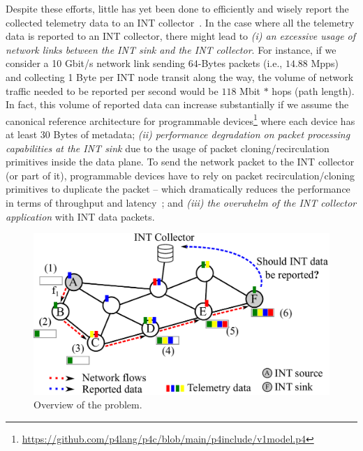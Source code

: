 Despite these efforts, little has yet been done to efficiently and wisely report the collected telemetry data to an INT collector~\cite{9525085}. In the case where all the telemetry data is reported to an INT collector, there might lead to \textit{(i) an excessive usage of network links between the INT sink and the INT collector}. For instance, if we consider a 10 Gbit/s network link sending $64$-Bytes packets (i.e.,  $14.88$ Mpps) and collecting 1 Byte per INT node transit along the way, the volume of network traffic needed to be reported per second would be $118$ Mbit $*$ hops (path length). In fact, this volume of reported data can increase substantially if we assume the canonical reference architecture for programmable devices\footnote{\url{https://github.com/p4lang/p4c/blob/main/p4include/v1model.p4}} where each device has at least 30 Bytes of metadata; \textit{(ii) performance degradation on packet processing capabilities at the INT sink} due to the usage of packet cloning/recirculation primitives inside the data plane. To send the network packet to the INT collector (or part of it), programmable devices have to rely on packet recirculation/cloning primitives to duplicate the packet -- which dramatically reduces the performance in terms of throughput and latency~\cite{aina2021}; and \textit{(iii) the overwhelm of the INT collector application} with INT data packets.

\begin{figure}[t]
\centering
        \includegraphics[scale=0.4]{aina-img/telemetry-canofre-aina.pdf}
        \caption{Overview of the problem.}
        \label{fig-problem-overview}
\end{figure}

